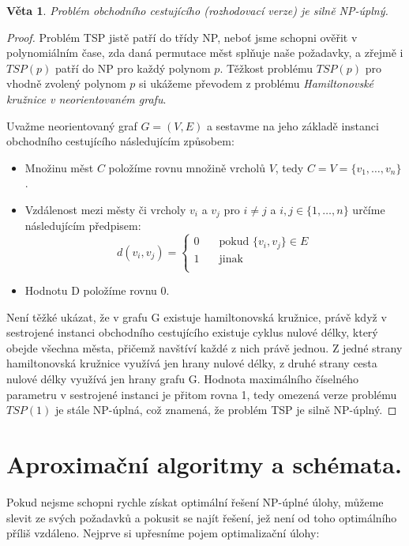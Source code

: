 \documentclass[11pt]{report} %
\newtheorem{theorem}{Věta}[section]
\numberwithin{equation}{section}
\begin{document}
\begin{theorem}
	Problém obchodního cestujícího (rozhodovací verze) je silně NP-úplný.
\end{theorem}
\begin{proof}
Problém TSP jistě patří do třídy NP, neboť jsme schopni ověřit v polynomiálním čase, zda daná permutace měst splňuje naše požadavky, a zřejmě i $TSP(p)$ patří do NP pro každý polynom $p$. Těžkost problému $TSP(p)$ pro vhodně zvolený polynom $p$ si ukážeme převodem z problému \textit{Hamiltonovské kružnice v neorientovaném grafu}. 

Uvažme neorientovaný graf $G = (V, E)$ a sestavme na jeho základě instanci obchodního cestujícího následujícím způsobem:
\begin{itemize}
	
	
	\item Množinu měst $C$ položíme rovnu množině vrcholů $V$, tedy $C = V = \{v_1, \dots, v_n\}$.
	\item Vzdálenost mezi městy či vrcholy $v_i$ a $v_j$ pro $i \neq j$ a $i, j \in \{1, \dots, n\}$ určíme následujícím
	předpisem:
	$$
	d(v_i, v_j) = 
	\begin{cases}
	0 & \quad \text{pokud } \{v_i, v_j\} \in E \\
	1 & \quad \text{jinak} \\
	\end{cases}
	$$
	\item Hodnotu D položíme rovnu 0. 
\end{itemize}

Není těžké ukázat, že v grafu G existuje hamiltonovská kružnice, právě když v sestrojené instanci obchodního cestujícího existuje cyklus nulové délky, který obejde všechna města, přičemž navštíví každé z nich právě jednou. Z jedné strany hamiltonovská kružnice využívá jen hrany nulové délky, z druhé strany cesta nulové délky využívá jen hrany grafu G. Hodnota maximálního číselného parametru v sestrojené instanci je přitom rovna 1, tedy omezená verze problému $TSP(1)$ je stále NP-úplná, což znamená, že problém TSP je silně NP-úplný.	
\end{proof}



\section{Aproximační algoritmy a schémata.}
Pokud nejsme schopni rychle získat optimální řešení NP-úplné úlohy, můžeme slevit ze svých požadavků a pokusit se najít řešení, jež není od toho optimálního příliš vzdáleno. Nejprve si upřesníme pojem optimalizační úlohy:
\end{document}
